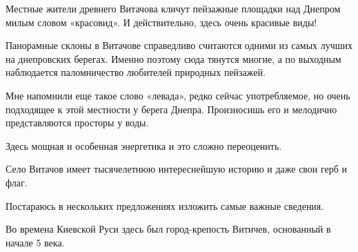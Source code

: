 \raggedcolumns
\begin{multicols}{3} %
\setlength{\parindent}{0pt}








\end{multicols} %

Местные жители древнего Витачова кличут пейзажные площадки над Днепром милым
словом «красовид». И действительно, здесь очень красивые виды!

Панорамные склоны в Витачове справедливо считаются одними из самых лучших на
днепровских берегах. Именно поэтому сюда тянутся многие, а по выходным
наблюдается паломничество любителей природных пейзажей. 


Мне напомнили еще такое слово «левада», редко сейчас употребляемое, но очень
подходящее к этой местности у берега Днепра. Произносишь его и мелодично
представляются просторы у воды. 

Здесь мощная и особенная  энергетика и это  сложно переоценить. 

Село Витачов имеет тысячелетнюю интереснейшую историю и даже свои герб и флаг.

Постараюсь в нескольких предложениях изложить самые важные сведения.

Во времена Киевской Руси здесь был город-крепость Витичев, основанный в начале
5 века. 

\raggedcolumns
\begin{multicols}{2} %
\setlength{\parindent}{0pt}



\end{multicols} %


